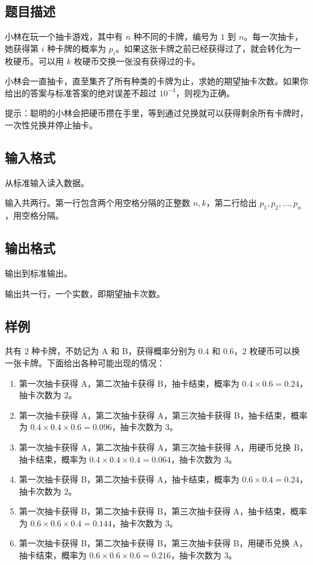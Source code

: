 \subsection*{题目描述}

小林在玩一个抽卡游戏，其中有 $n$ 种不同的卡牌，编号为 $1$ 到 $n$。每一次抽卡，她获得第 $i$ 种卡牌的概率为 $p_i$。如果这张卡牌之前已经获得过了，就会转化为一枚硬币。可以用 $k$ 枚硬币交换一张没有获得过的卡。

小林会一直抽卡，直至集齐了所有种类的卡牌为止，求她的期望抽卡次数。如果你给出的答案与标准答案的绝对误差不超过 $10^{-4}$，则视为正确。

提示：聪明的小林会把硬币攒在手里，等到通过兑换就可以获得剩余所有卡牌时，一次性兑换并停止抽卡。

\subsection*{输入格式}

从标准输入读入数据。

输入共两行。第一行包含两个用空格分隔的正整数 $n, k$，第二行给出 $p_1, p_2, \dots, p_n$，用空格分隔。

\subsection*{输出格式}

输出到标准输出。

输出共一行，一个实数，即期望抽卡次数。

\subsection*{样例}

\examplebox*{}{}

共有 $2$ 种卡牌，不妨记为 A 和 B，获得概率分别为 $0.4$ 和 $0.6$，$2$ 枚硬币可以换一张卡牌。下面给出各种可能出现的情况：

\begin{enumerate}
    \item 第一次抽卡获得 A，第二次抽卡获得 B，抽卡结束，概率为 $0.4 \times 0.6 = 0.24$，抽卡次数为 $2$。
    \item 第一次抽卡获得 A，第二次抽卡获得 A，第三次抽卡获得 B，抽卡结束，概率为 $0.4 \times 0.4 \times 0.6 = 0.096$，抽卡次数为 $3$。
    \item 第一次抽卡获得 A，第二次抽卡获得 A，第三次抽卡获得 A，用硬币兑换 B，抽卡结束，概率为 $0.4 \times 0.4 \times 0.4 = 0.064$，抽卡次数为 $3$。
    \item 第一次抽卡获得 B，第二次抽卡获得 A，抽卡结束，概率为 $0.6 \times 0.4 = 0.24$，抽卡次数为 $2$。
    \item 第一次抽卡获得 B，第二次抽卡获得 B，第三次抽卡获得 A，抽卡结束，概率为 $0.6 \times 0.6 \times 0.4 = 0.144$，抽卡次数为 $3$。
    \item 第一次抽卡获得 B，第二次抽卡获得 B，第三次抽卡获得 B，用硬币兑换 A，抽卡结束，概率为 $0.6 \times 0.6 \times 0.6 = 0.216$，抽卡次数为 $3$。
\end{enumerate}

